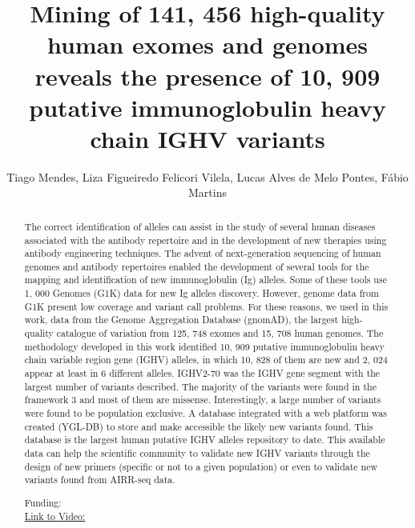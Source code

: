 \documentclass[twoside]{article}
\title{\vspace{-15mm}\fontsize{24pt}{10pt}\selectfont\textbf{ Mining of 141, 456 high-quality human exomes and genomes reveals the presence of 10, 909 putative immunoglobulin heavy chain IGHV variants }} %
\author{ Tiago Mendes,  Liza Figueiredo Felicori Vilela,  Lucas Alves de Melo Pontes,  F\'abio Martins }
\affil{ UNIVERSIDADE FEDERAL DE MINAS GERAIS,  Ufv,  UFMG }
\date{}
\begin{document}
  
  
  \maketitle %
  
  
  \thispagestyle{fancy} %
  
  
  \begin{abstract}
  The correct identification of alleles can assist in the study of several human diseases associated with the antibody repertoire and in the development of new therapies using antibody engineering techniques.  The advent of next-generation sequencing of human genomes and antibody repertoires enabled the development of several tools for the mapping and identification of new immunoglobulin (Ig) alleles. Some of these tools use 1, 000 Genomes (G1K) data for new Ig alleles discovery. However,  genome data from G1K present low coverage and variant call problems. For these reasons,  we used in this work,  data from the Genome Aggregation Database (gnomAD),  the largest high-quality catalogue of variation from 125, 748 exomes and 15, 708 human genomes. 
The methodology developed in this work identified 10, 909 putative immunoglobulin heavy chain variable region gene (IGHV) alleles,  in which 10, 828 of them are new and 2, 024 appear at least in 6 different alleles. IGHV2-70 was the IGHV gene segment with the largest number of variants described. The majority of the variants were found in the framework 3 and most of them are missense. Interestingly,  a large number of variants were found to be population exclusive. A database integrated with a web platform was created (YGL-DB) to store and make accessible the likely new variants found. This database is the largest human putative IGHV alleles repository to date. 
This available data can help the scientific community to validate new IGHV variants through the design of new primers (specific or not to a given population) or even to validate new variants found from AIRR-seq data.
  
  Funding:   \\
  \href{http://ab3c.org.br/xpress_pres2020/xmxp2020-303186.html}{Link to Video:}

  \end{abstract}
   
  
\end{document}
